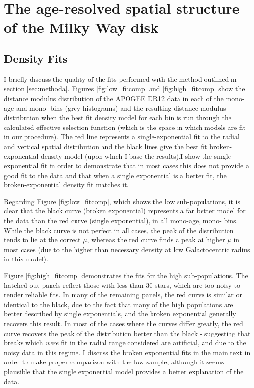 \chapter{The age-resolved spatial structure of the Milky Way disk}

\section{Density Fits}
\label{sec:densityfits}
I briefly discuss the quality of the fits performed with the method outlined in section \ref{sec:methoda}. Figures \ref{fig:low_fitcomp} and \ref{fig:high_fitcomp} show the distance modulus distribution of the APOGEE DR12 data in each of the mono-age and mono-\feh{} bins (grey histograms) and the resulting distance modulus distribution when the best fit density model for each bin is run through the calculated effective selection function (which is the space in which models are fit in our procedure). The red line represents a single-exponential fit to the radial and vertical spatial distribution and the black lines give the best fit broken-exponential density model (upon which I base the results).I show the single-exponential fit in order to demonstrate that in most cases this does not provide a good fit to the data and that when a single exponential is a better fit, the broken-exponential density fit matches it.

Regarding Figure \ref{fig:low_fitcomp}, which shows the low \afe{} sub-populations, it is clear that the black curve (broken exponential) represents a far better model for the data than the red curve (single exponential), in all mono-age, mono-\feh{} bins. While the black curve is not perfect in all cases, the peak of the distribution tends to lie at the correct $\mu$, whereas the red curve finds a peak at higher $\mu$ in most cases (due to the higher than necessary density at low Galactocentric radius in this model).

 Figure \ref{fig:high_fitcomp} demonstrates the fits for the high \afe{} sub-populations. The hatched out panels reflect those with less than 30 stars, which are too noisy to render reliable fits. In many of the remaining panels, the red curve is similar or identical to the black, due to the fact that many of the high \afe{} populations are better described by single exponentials, and the broken exponential generally recovers this result. In most of the cases where the curves differ greatly, the red curve recovers the peak of the distribution better than the black - suggesting that breaks which \emph{were} fit in the radial range considered are artificial, and due to the noisy data in this regime. I discuss the broken exponential fits in the main text in order to make proper comparison with the low \afe{} sample, although it seems plausible that the single exponential model provides a better explanation of the data. 

